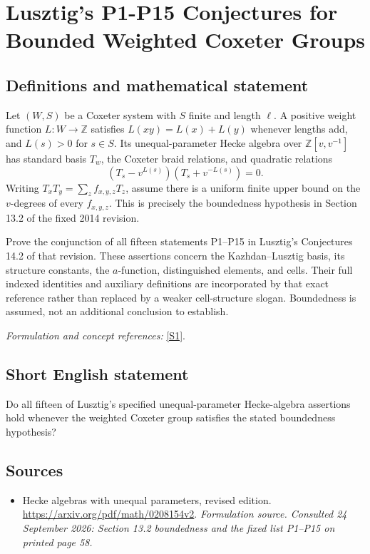 \documentclass[11pt]{article}
\begin{document}
\section*{\texorpdfstring{Lusztig's P1-P15 Conjectures for Bounded Weighted Coxeter Groups}{Lusztig's P1-P15 Conjectures for Bounded Weighted Coxeter Groups}}\label{30006955}
\subsection{Definitions and mathematical statement}
Let $(W,S)$ be a Coxeter system with $S$ finite and length $\ell$. A positive weight function $L:W\to{\mathbb{Z}}$ satisfies $L(xy)=L(x)+L(y)$ whenever lengths add, and $L(s)>0$ for $s\in S$. Its unequal-parameter Hecke algebra over ${\mathbb{Z}}[v,v^{-1}]$ has standard basis $T_w$, the Coxeter braid relations, and quadratic relations
\[
 (T_s-v^{L(s)})(T_s+v^{-L(s)})=0.
\]
Writing $T_xT_y=\sum_zf_{x,y,z}T_z$, assume there is a uniform finite upper bound on the $v$-degrees of every $f_{x,y,z}$. This is precisely the boundedness hypothesis in Section 13.2 of the fixed 2014 revision.

Prove the conjunction of all fifteen statements P1--P15 in Lusztig's Conjectures 14.2 of that revision. These assertions concern the Kazhdan--Lusztig basis, its structure constants, the $a$-function, distinguished elements, and cells. Their full indexed identities and auxiliary definitions are incorporated by that exact reference rather than replaced by a weaker cell-structure slogan. Boundedness is assumed, not an additional conclusion to establish.
\par\smallskip\textit{Formulation and concept references:} \href{https://arxiv.org/pdf/math/0208154v2}{[S1]}.

\subsection{Short English statement}
Do all fifteen of Lusztig's specified unequal-parameter Hecke-algebra assertions hold whenever the weighted Coxeter group satisfies the stated boundedness hypothesis?
\subsection{Sources}
\begin{itemize}
\item[S1]Hecke algebras with unequal parameters, revised edition.
\url{https://arxiv.org/pdf/math/0208154v2}.
\textit{Formulation source. Consulted 24 September 2026: Section 13.2 boundedness and the fixed list P1–P15 on printed page 58.}
\end{itemize}
\end{document}
